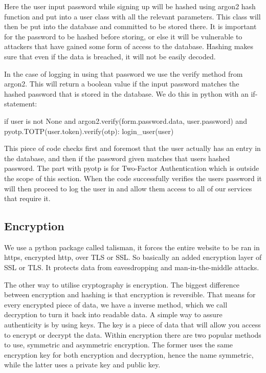 Here the user input password while signing up will be hashed using argon2 hash function and put into a user class with all the relevant parameters. This class will then be put into the database and committed to be stored there. It is important for the password to be hashed before storing, or else it will be vulnerable to attackers that have gained some form of access to the database. Hashing makes sure that even if the data is breached, it will not be easily decoded. 

\pagebreak
In the case of logging in using that password we use the verify method from argon2. This will return a boolean value if the input password matches the hashed password that is stored in the database. We do this in python with an if-statement: 
\begin{python}
if user is not None and argon2.verify(form.password.data, 
            user.password) and pyotp.TOTP(user.token).verify(otp):
    login_user(user)
\end{python}

This piece of code checks first and foremost that the user actually has an entry in the database, and then if the password given matches that users hashed password. The part with pyotp is for Two-Factor Authentication which is outside the scope of this section. When the code successfully verifies the users password it will then proceed to log the user in and allow them access to all of our services that require it.

\subsection{Encryption}
We use a python package called talisman, it forces the entire website to be ran in https, encrypted http, over TLS or SSL.
So basically an added encryption layer of SSL or TLS. It protects data from eavesdropping and man-in-the-middle attacks.

The other way to utilise cryptography is encryption. The biggest difference between encryption and hashing is that encryption is reversible. That means for every encrypted piece of data, we have a inverse method, which we call decryption to turn it back into readable data. A simple way to assure authenticity is by using keys. The key is a piece of data that will allow you access to encrypt or decrypt the data. Within encryption there are two popular methods to use, symmetric and asymmetric encryption. The former uses the same encryption key for both encryption and decryption, hence the name symmetric, while the latter uses a private key and public key.

